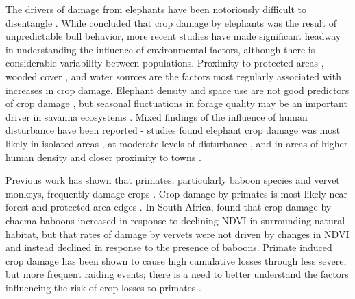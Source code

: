 \documentclass[12pt,]{article}
\begin{document}
The drivers of damage from elephants have been notoriously difficult to disentangle \citep{Sitati2003}. While \cite{Hoare1999DeterminantsMosaic} concluded that crop damage by elephants was the result of unpredictable bull behavior, more recent studies have made significant headway in understanding the influence of environmental factors, although there is considerable variability between populations. Proximity to protected areas \citep{NaughtonTreves1998, Mackenzie2012, Guerbois2012, DenningerSnyder2019}, wooded cover \citep{NaughtonTreves1998, Nyhus2000, Graham2010PatternsConflict}, and water sources \citep{Pozo2018} are the factors most regularly associated with increases in crop damage. Elephant density and space use are not good predictors of crop damage \citep{Hoare1999DeterminantsMosaic,Pozo2018}, but seasonal fluctuations in forage quality may be an important driver in savanna ecosystems \citep{Chiyo2005}. Mixed findings of the influence of human disturbance have been reported  - studies found elephant crop damage was most likely in isolated areas \citep{Graham2010PatternsConflict,Songhurst2014}, at moderate levels of disturbance \citep{DenningerSnyder2019}, and in areas of higher human density and closer proximity to towns \citep{Sitati2003}. 

Previous work has shown that primates, particularly baboon species and vervet monkeys, frequently damage crops \citep{Mackenzie2012, Alemayehu2020, Tweheyo2005, Wallace2012}. Crop damage by primates is most likely near forest and protected area edges \citep{Hill2000,Mwakatobe2014, Saj2001, Kagoro-Rugunda2004, Wallace2012, Fehlmann2017}. In South Africa, \cite{Findlay2020} found that crop damage by chacma baboons increased in response to declining NDVI in surrounding natural habitat, but that rates of damage by vervets were not driven by changes in NDVI and instead declined in response to the presence of baboons. Primate induced crop damage has been shown to cause high cumulative losses through less severe, but more frequent raiding events; there is a need to better understand the factors influencing the risk of crop losses to primates \citep{NaughtonTreves1998}. 
\end{document}
